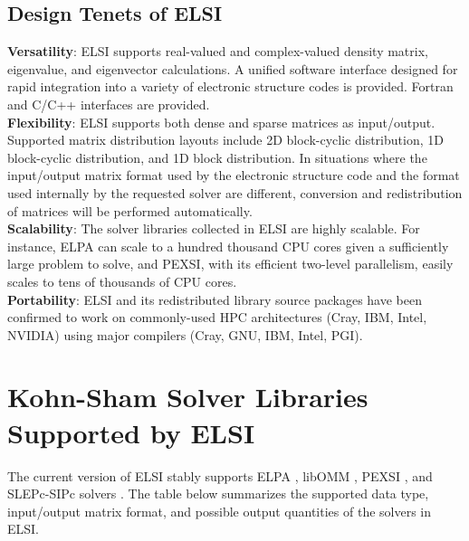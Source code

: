 \documentclass{report}
\begin{document}
\subsection{Design Tenets of ELSI}
\label{subsec:elsi_design}
\textbf{Versatility}:  ELSI supports real-valued and complex-valued density matrix, eigenvalue, and eigenvector calculations.  A unified software interface designed for rapid integration into a variety of electronic structure codes is provided.  Fortran and C/C++ interfaces are provided.\\

\textbf{Flexibility}:  ELSI supports both dense and sparse matrices as input/output.  Supported matrix distribution layouts include 2D block-cyclic distribution, 1D block-cyclic distribution, and 1D block distribution.  In situations where the input/output matrix format used by the electronic structure code and the format used internally by the requested solver are different, conversion and redistribution of matrices will be performed automatically.\\

\textbf{Scalability}:  The solver libraries collected in ELSI are highly scalable.  For instance, ELPA can scale to a hundred thousand CPU cores given a sufficiently large problem to solve, and PEXSI, with its efficient two-level parallelism, easily scales to tens of thousands of CPU cores.\\

\textbf{Portability}:  ELSI and its redistributed library source packages have been confirmed to work on commonly-used HPC architectures (Cray, IBM, Intel, NVIDIA) using major compilers (Cray, GNU, IBM, Intel, PGI).\\

\section{Kohn-Sham Solver Libraries Supported by ELSI}
\label{sec:solvers}
The current version of ELSI stably supports ELPA \cite{elpa_auckenthaler_2011,elpa_marek_2014}, libOMM \cite{libomm_corsetti_2014}, PEXSI \cite{pexsi_lin_2009,pexsi_lin_2013}, and SLEPc-SIPc solvers \cite{slepc_hernandez_2005,sips_keceli_2016}.  The table below summarizes the supported data type, input/output matrix format, and possible output quantities of the solvers in ELSI.\\
\end{document}
